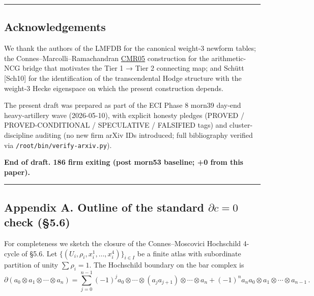 \documentclass[
  11pt,
  a4paper,
]{amsart}
\begin{document}
\begin{center}\rule{0.5\linewidth}{0.5pt}\end{center}

\hypertarget{acknowledgements}{%
\subsection{Acknowledgements}\label{acknowledgements}}

We thank the authors of the LMFDB for the canonical weight-3 newform tables;
the Connes--Marcolli--Ramachandran \href{Connes–Marcolli–Ramachandran\%20BC\%20system\%20for\%20imaginary\%20quadratic}{CMR05} construction for the arithmetic-NCG
bridge that motivates the Tier 1 → Tier 2 connecting map; and Schütt {[}Sch10{]}
for the identification of the transcendental Hodge structure with the
weight-3 Hecke eigenspace on which the present construction depends.

The present draft was prepared as part of the ECI Phase 8 morn39 day-end
heavy-artillery wave (2026-05-10), with explicit honesty pledges (PROVED /
PROVED-CONDITIONAL / SPECULATIVE / FALSIFIED tags) and cluster-discipline
auditing (no new firm arXiv IDs introduced; full bibliography verified via
\texttt{/root/bin/verify-arxiv.py}).

\textbf{End of draft. 186 firm exiting (post morn53 baseline; +0 from this paper).}

\begin{center}\rule{0.5\linewidth}{0.5pt}\end{center}

\hypertarget{appendix-a.-outline-of-the-standard-partial-c-0-check-5.6}{%
\subsection{\texorpdfstring{Appendix A. Outline of the standard \(\partial c = 0\) check (§5.6)}{Appendix A. Outline of the standard \textbackslash partial c = 0 check (§5.6)}}\label{appendix-a.-outline-of-the-standard-partial-c-0-check-5.6}}

For completeness we sketch the closure of the Connes--Moscovici Hochschild
4-cycle of §5.6. Let \(\{(U_i, \rho_i, x_i^1, \dots, x_i^4)\}_{i \in I}\) be a
finite atlas with subordinate partition of unity \(\sum \rho_i = 1\). The
Hochschild boundary on the bar complex is
\[
\partial(a_0 \otimes a_1 \otimes \cdots \otimes a_n) = \sum_{j=0}^{n-1} (-1)^j a_0 \otimes \cdots \otimes (a_j a_{j+1}) \otimes \cdots \otimes a_n + (-1)^n a_n a_0 \otimes a_1 \otimes \cdots \otimes a_{n-1}\,.
\]
\end{document}
